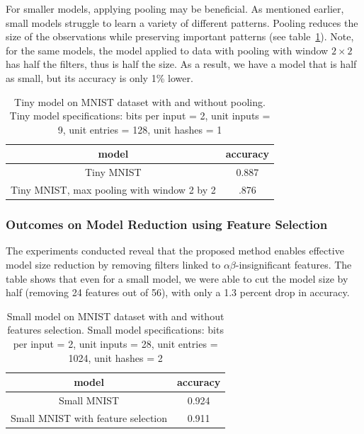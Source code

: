 \documentclass{article}[12pt]
\begin{document}
For smaller models, applying pooling may be beneficial.
As mentioned earlier, small models struggle to learn a variety of different patterns.
Pooling reduces the size of the observations while preserving important patterns (see table~\ref{tab:table-2}).
Note, for the same models, the model applied to data with pooling with window $2\times{}2$ has half the filters, thus is half the size.
As a result, we have a model that is half as small, but its accuracy is only 1\% lower.
\begin{table}[h]
    \centering
    \begin{tabular}{|c|c|}
    \hline
    model & accuracy \\
    \hline
       Tiny MNIST &  0.887\\
    \hline
       Tiny MNIST, max pooling with window 2 by 2  & .876\\
    \hline
    \end{tabular}
    \caption{Tiny model on MNIST dataset with and without pooling. Tiny model specifications: bits per input = 2, unit inputs = 9, unit entries = 128, unit hashes = 1}
    \label{tab:table-2}
\end{table}

\subsubsection{Outcomes on Model Reduction using Feature Selection}
The experiments conducted reveal that the proposed method enables effective model size reduction by removing filters linked to $\alpha\beta$-insignificant features.
The table shows that even for a small model, we were able to cut the model size by half (removing 24 features out of 56), with only a 1.3 percent drop in accuracy.
\begin{table}[h]
    \centering
    \begin{tabular}{|c|c|}
    \hline
    model & accuracy \\
    \hline
       Small MNIST &  0.924\\
    \hline
       Small MNIST with feature selection  & 0.911\\
    \hline
    \end{tabular}
    \caption{Small model on MNIST dataset with and without features selection. Small model specifications: bits per input = 2, unit inputs = 28, unit entries = 1024, unit hashes = 2}
    \label{tab:table-22}
\end{table}
\end{document}

